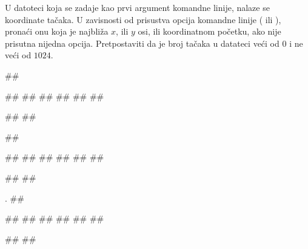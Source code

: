 \begin{Answer}[ref=3_04]
\end{Answer}
\begin{Exercise}[label=3_05]
  U datoteci koja se zadaje kao prvi argument komandne linije, nalaze
  se koordinate tačaka. U zavisnosti od prisustva opcija komandne
  linije ( ili ), pronaći onu koja je najbliža
  $x$, ili $y$ osi, ili koordinatnom početku, ako nije
  prisutna nijedna opcija. Pretpostaviti da je broj tačaka u datateci
  veći od $0$ i ne veći od $1024$.
  
\begin{minitest}
\begin{test}{1}
##

##
##
##
##
##
##

#\naslovIzlaz#
##
\end{test}
\end{minitest}
\begin{minitest}
\begin{test}{2}
##
  
##
##
##
##
##
##

#\naslovIzlaz#
##
\end{test}
\end{minitest}
\begin{minitest}
\begin{test}{3}.
##

##
##
##
##
##
##
  
#\naslovIzlaz#
##
\end{test}
\end{minitest}


\end{Exercise}

